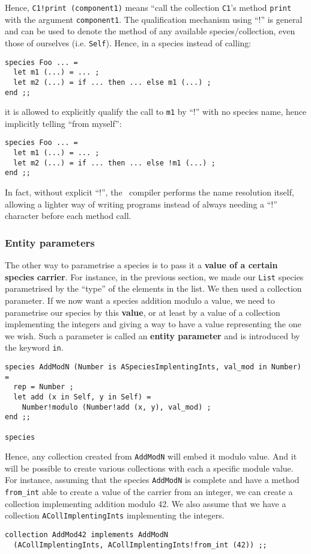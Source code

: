 Hence, {\tt C1!print (component1)} means ``call the collection
{\tt C1}'s method {\tt print} with the argument {\tt component1}. The
qualification mechanism using ``!'' is general and can be used to
denote the method of any available species/collection, even those of
ourselves (i.e. {\tt Self}). Hence, in a species instead of calling:
{\scriptsize
\begin{lstlisting}
species Foo ... =
  let m1 (...) = ... ;
  let m2 (...) = if ... then ... else m1 (...) ;
end ;;
\end{lstlisting}
}
it is allowed to explicitly qualify the call to {\tt m1} by ``!''
with no species name, hence implicitly telling ``from myself'':
{\scriptsize
\begin{lstlisting}
species Foo ... =
  let m1 (...) = ... ;
  let m2 (...) = if ... then ... else !m1 (...) ;
end ;;
\end{lstlisting}
}
In fact, without explicit ``!'', the \focal\ compiler performs the
name resolution itself, allowing a lighter way of writing programs
instead of always needing a ``!'' character before each method call.



\subsubsection{Entity parameters}
\label{entity-parameter}
The other way to parametrise a species is to pass it a
{\bf value of a certain species carrier}. For instance, in the
previous section, we made our {\tt List} species parametrised by the
``type'' of the elements in the list. We then used a collection
parameter. If we now want a species addition modulo a value, we need
to parametrise our species by this {\bf value}, or at least by a
value of a collection implementing the integers and giving a way to
have a value representing the one we wish. Such a parameter is called
an {\bf entity parameter} and is introduced by the keyword {\tt in}.
{\scriptsize
\begin{lstlisting}
species AddModN (Number is ASpeciesImplentingInts, val_mod in Number) =
  rep = Number ;
  let add (x in Self, y in Self) =
    Number!modulo (Number!add (x, y), val_mod) ;
end ;;

species
\end{lstlisting}
}

Hence, any collection created from {\tt AddModN} will embed it modulo
value. And it will be possible to create various collections with each
a specific module value. For instance, assuming that the species
{\tt AddModN} is complete and have a method {\tt from\_int} able to
create a value of the carrier from an integer, we can create a
collection implementing addition modulo 42. We also assume that we
have a collection {\tt ACollImplentingInts} implementing the
integers.
{\scriptsize
\begin{lstlisting}
collection AddMod42 implements AddModN
  (ACollImplentingInts, ACollImplentingInts!from_int (42)) ;;
\end{lstlisting}
}



